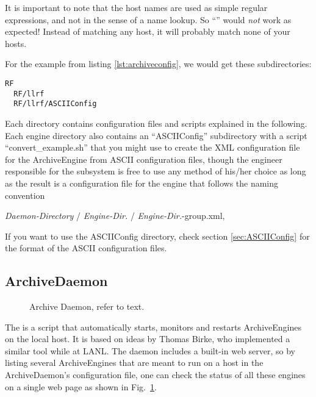 It is important to note that the host names are used as simple regular expressions,
and not in the sense of a name lookup.
So ``'' would \emph{not} work as expected!
Instead of matching any host, it will probably match none of your hosts.

For the example from listing \ref{lst:archiveconfig}, we would get
these subdirectories:
\begin{lstlisting}[frame=none,keywordstyle=\sffamily]
  RF
  RF/llrf
  RF/llrf/ASCIIConfig
\end{lstlisting}
\noindent Each directory contains configuration files and scripts
explained in the following. Each engine directory also contains an
``ASCIIConfig'' subdirectory with a script ``convert\_example.sh''
that you might use to create the XML configuration file for the
ArchiveEngine from ASCII configuration files, though the engineer
responsible for the subsystem is free to use any method of his/her
choice as long as the result is a configuration file for the engine
that follows the naming convention
\begin{center}
\emph{Daemon-Directory} / \emph{Engine-Dir.} / \emph{Engine-Dir.}-group.xml,\\
\end{center}
If you want to use the ASCIIConfig directory, check section
\ref{sec:ASCIIConfig} for the format of the ASCII configuration files.

\subsection{ArchiveDaemon} \label{sec:daemon}
\begin{figure}[htb]
\begin{center}
\end{center}
\caption{\label{fig:daemon}Archive Daemon, refer to text.}
\end{figure}

\noindent The  is a script that automatically starts,
monitors and restarts ArchiveEngines on the local host. It is based on
ideas by Thomas Birke, who implemented a similar 
tool while at LANL. The daemon includes a built-in web server, so by
listing several ArchiveEngines that are meant to run on a host in the
ArchiveDaemon's configuration file, one can check the status of all
these engines on a single web page as shown in Fig.~\ref{fig:daemon}.

